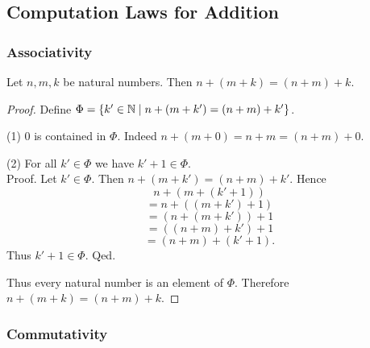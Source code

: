 \documentclass[10pt]{article}
\begin{document}
  \subsection*{Computation Laws for Addition}

  \subsubsection*{Associativity}

  \begin{forthel}
    \begin{proposition}[id=ARITHMETIC_03_3235893452210176,printid]
      Let $n, m, k$ be natural numbers.
      Then $n + (m + k) = (n + m) + k$.
    \end{proposition}
    \begin{proof}
      Define $\Phi = \{ k' \in \mathbb{N} \mid n + (m + k') = (n + m) + k' \}$.

      (1) $0$ is contained in $\Phi$.
      Indeed $n + (m + 0) = n + m = (n + m) + 0$.

      (2) For all $k' \in \Phi$ we have $k' + 1 \in \Phi$. \\
      Proof.
        Let $k' \in \Phi$.
        Then $n + (m + k') = (n + m) + k'$.
        Hence
        \[  n + (m + (k' + 1))        \]
        \[    = n + ((m + k') + 1)    \]
        \[    = (n + (m + k')) + 1    \]
        \[    = ((n + m) + k') + 1    \]
        \[    = (n + m) + (k' + 1).   \]
        Thus $k' + 1 \in \Phi$.
      Qed.

      Thus every natural number is an element of $\Phi$.
      Therefore $n + (m + k) = (n + m) + k$.
    \end{proof}
  \end{forthel}


  \subsubsection*{Commutativity}
\end{document}
